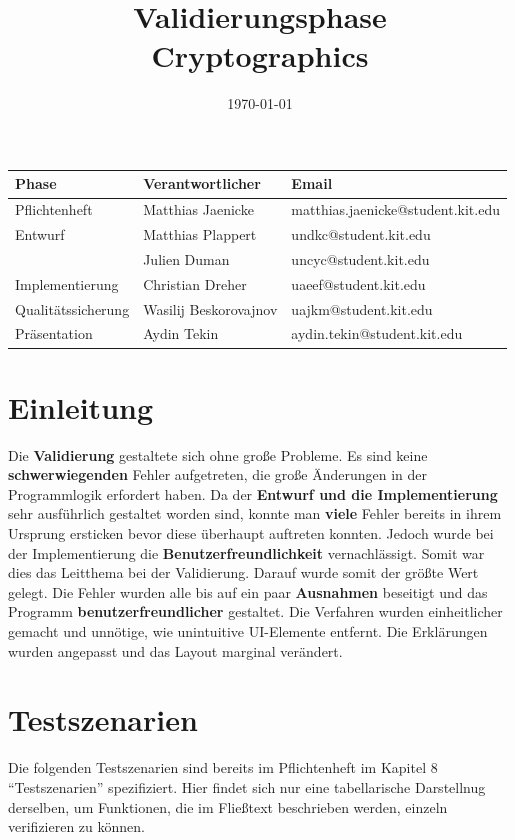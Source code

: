 \documentclass{article}
\title{\textbf{Validierungsphase} \\ Cryptographics}
\author{}
\date{\today}
\begin{document}
\maketitle
\begin{table}[b]
  \begin{tabular}{| l | l | l |}
    \hline
    \textbf{Phase} & \textbf{Verantwortlicher} & \textbf{Email} \\ \hline
    Pflichtenheft & Matthias Jaenicke & matthias.jaenicke@student.kit.edu \\ \hline
    Entwurf & Matthias Plappert & undkc@student.kit.edu \\
            & Julien Duman & uncyc@student.kit.edu \\ \hline
    Implementierung & Christian Dreher & uaeef@student.kit.edu \\ \hline
    Qualitätssicherung & Wasilij Beskorovajnov & uajkm@student.kit.edu \\ \hline
    Präsentation & Aydin Tekin & aydin.tekin@student.kit.edu \\ \hline
    \end{tabular}
\end{table}
\thispagestyle{empty}
\newpage

\tableofcontents
\newpage

\section{Einleitung}
 Die \textbf{Validierung} gestaltete sich ohne große Probleme. Es sind keine \textbf{schwerwiegenden} Fehler aufgetreten, die große Änderungen in der Programmlogik 
 erfordert haben. Da der \textbf{Entwurf und die Implementierung} sehr ausführlich gestaltet worden sind, konnte man \textbf{viele} Fehler bereits in ihrem Ursprung 
 ersticken bevor diese überhaupt auftreten konnten. Jedoch wurde bei der Implementierung die \textbf{Benutzerfreundlichkeit} vernachlässigt. Somit war
 dies das Leitthema bei der Validierung. Darauf wurde somit der größte Wert gelegt.\newline
 Die Fehler wurden alle bis auf ein paar \textbf{Ausnahmen} beseitigt und das Programm \textbf{benutzerfreundlicher} gestaltet. Die Verfahren wurden einheitlicher
 gemacht und unnötige, wie unintuitive UI-Elemente entfernt. Die Erklärungen wurden angepasst und das Layout marginal verändert.

\section{Testszenarien}
  Die folgenden Testszenarien sind bereits im Pflichtenheft im Kapitel 8 ``Testszenarien'' spezifiziert. Hier
  findet sich nur eine tabellarische Darstellnug derselben, um Funktionen, die im Fließtext beschrieben werden,
  einzeln verifizieren zu können.
  
\end{document}

